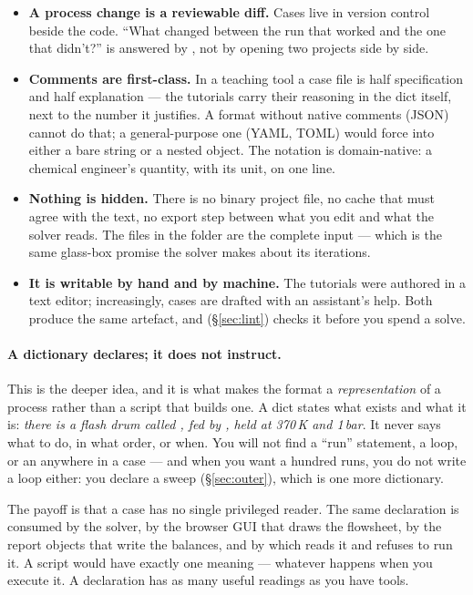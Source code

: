 \documentclass[11pt,a4paper]{article}
\begin{document}
\begin{itemize}[leftmargin=*]
  \item \textbf{A process change is a reviewable diff.}  Cases live in
        version control beside the code.  ``What changed between the
        run that worked and the one that didn't?'' is answered by
        , not by opening two projects side by side.
  \item \textbf{Comments are first-class.}  In a teaching tool a case
        file is half specification and half explanation --- the
        tutorials carry their reasoning in the dict itself, next to the
        number it justifies.  A format without native comments (JSON)
        cannot do that; a general-purpose one (YAML, TOML) would force
         into either a bare string or a nested object.
        The notation is domain-native: a chemical engineer's quantity,
        with its unit, on one line.
  \item \textbf{Nothing is hidden.}  There is no binary project file, no
        cache that must agree with the text, no export step between what
        you edit and what the solver reads.  The files in the folder are
        the complete input --- which is the same glass-box promise the
        solver makes about its iterations.
  \item \textbf{It is writable by hand and by machine.}  The tutorials
        were authored in a text editor; increasingly, cases are drafted
        with an assistant's help.  Both produce the same artefact, and
         (\S\ref{sec:lint}) checks it before you
        spend a solve.
\end{itemize}

\paragraph{A dictionary declares; it does not instruct.}  This is the
deeper idea, and it is what makes the format a \emph{representation} of
a process rather than a script that builds one.  A dict states what
exists and what it is: \emph{there is a flash drum called
, fed by , held at 370\,K and 1\,bar}.  It
never says what to do, in what order, or when.  You will not find a
``run'' statement, a loop, or an  anywhere in a case --- and
when you want a hundred runs, you do not write a loop either: you
declare a sweep (\S\ref{sec:outer}), which is one more dictionary.

The payoff is that a case has no single privileged reader.  The same
declaration is consumed by the solver, by the browser GUI that draws the
flowsheet, by the report objects that write the balances, and by
 which reads it and refuses to run it.  A script would
have exactly one meaning --- whatever happens when you execute it.  A
declaration has as many useful readings as you have tools.
\end{document}
